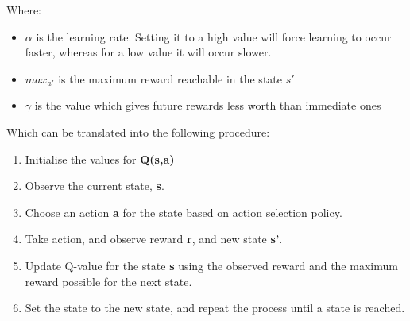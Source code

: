 \documentclass[11pt]{article}
\begin{document}
Where:
\begin{itemize}
	\item $\alpha$ is the learning rate. Setting it to a high value will force learning to occur faster, whereas for a low value it will occur slower.
	\item $max_{a'}$ is the maximum reward reachable in the state $s'$
	\item $\gamma$ is the value which gives future rewards less worth than immediate ones
\end{itemize}


Which can be translated into the following procedure:
\begin{enumerate}
	\item Initialise the values for \textbf{Q(s,a)}
	\item Observe the current state, \textbf{s}.
	\item Choose an action \textbf{a} for the state based on action selection policy.
	\item Take action, and observe reward \textbf{r}, and new state \textbf{s'}.
	\item Update Q-value for the state \textbf{s} using the observed reward and the maximum reward possible for the next state.
	\item Set the state to the new state, and repeat the process until a state is reached.
\end{enumerate}
\end{document}
